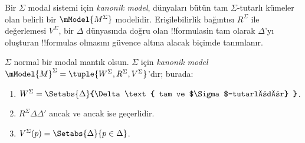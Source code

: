 \documentclass[../../../include/open-logic-section]{subfiles}
\begin{document}


Bir $\Sigma$ modal sistemi için \emph{kanonik model}, dünyaları bütün tam
$\Sigma$-tutarlı kümeler olan belirli bir $\mModel{M^\Sigma}$ modelidir.
Erişilebilirlik bağıntısı $R^\Sigma$ ile değerlemesi $V^\Sigma$, bir
$\Delta$ dünyasında doğru olan !!{formula}s{}in tam olarak $\Delta$'yı
oluşturan !!{formula}s olmasını güvence altına alacak biçimde tanımlanır.

\begin{defn}
  $\Sigma$ normal bir modal mantık olsun. $\Sigma$ için \emph{kanonik model}
  $\mModel{M}^\Sigma=\tuple{W^\Sigma,R^\Sigma,V^\Sigma}$'dır; burada:
  \begin{enumerate}
  \item $W^\Sigma = \Setabs{ \Delta }{\Delta \text{
      tam ve $\Sigma$-tutarlıdır} }$.
  \item $R^\Sigma\Delta\Delta'$ ancak ve ancak
     ise geçerlidir.
  \item $V^\Sigma(p)=\Setabs{\Delta}{p\in\Delta}$.
  \end{enumerate}
\end{defn}
\end{document}
